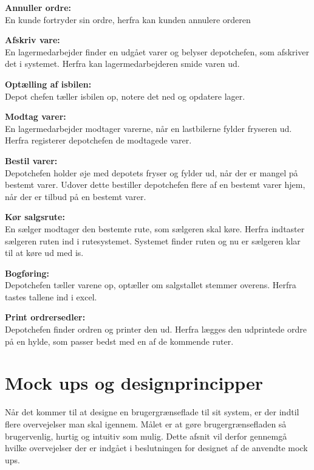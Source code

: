 \textbf{Annuller ordre:} \\
En kunde fortryder sin ordre, herfra kan kunden annulere orderen

\textbf{Afskriv vare:} \\
En lagermedarbejder finder en udgået varer og belyser depotchefen, som afskriver det i systemet. Herfra kan lagermedarbejderen smide varen ud. 

\textbf{Optælling af isbilen:} \\
Depot chefen tæller isbilen op, notere det ned og opdatere lager. 

\textbf{Modtag varer:} \\
En lagermedarbejder modtager varerne, når en lastbilerne fylder fryseren ud. Herfra registerer depotchefen de modtagede varer. 

\textbf{Bestil varer:} \\
Depotchefen holder øje med depotets fryser og fylder ud, når der er mangel på bestemt varer. Udover dette bestiller depotchefen flere af en bestemt varer hjem, når der er tilbud på en bestemt varer. 

\textbf{Kør salgsrute:} \\
En sælger modtager den bestemte rute, som sælgeren skal køre. Herfra indtaster sælgeren ruten ind i rutesystemet. Systemet finder ruten og nu er sælgeren klar til at køre ud med is. 

\textbf{Bogføring:} \\
Depotchefen tæller varene op, optæller om salgstallet stemmer overens. Herfra tastes tallene ind i excel. 

\textbf{Print ordrersedler:} \\
Depotchefen finder ordren og printer den ud. Herfra lægges den udprintede ordre på en hylde, som passer bedst med en af de kommende ruter.

\section{Mock ups og designprincipper}
Når det kommer til at designe en brugergrænseflade til sit system, er der indtil flere overvejelser man skal igennem. Målet er at gøre brugergrænsefladen så brugervenlig, hurtig og intuitiv som mulig. Dette afsnit vil derfor gennemgå hvilke overvejelser der er indgået i beslutningen for designet af de anvendte mock ups.

